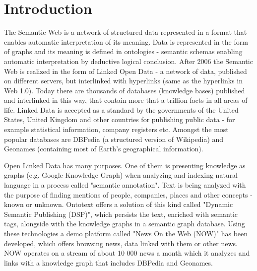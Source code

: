 \chapter{Introduction}
The Semantic Web is a network of structured data represented in a format that enables automatic interpretation of its meaning. Data is represented in the form of graphs and its meaning is defined in ontologies - semantic schemas enabling automatic interpretation by deductive logical conclusion. After 2006 the Semantic Web is realized in the form of Linked Open Data - a network of data, published on different servers, but interlinked with hyperlinks (same as the hyperlinks in Web 1.0). Today there are thousands of databases (knowledge bases) published and interlinked in this way, that contain more that a trillion facts in all areas of life. Linked Data is accepted as a standard by the governments of the United States, United Kingdom and other countries for publishing public data - for example statistical information, company registers etc. Amongst the most popular databases are DBPedia (a structured version of Wikipedia) and Geonames (containing most of Earth's geographical information).

Open Linked Data has many purposes. One of them is presenting knowledge as graphs (e.g. Google Knowledge Graph) when analyzing and indexing natural language in a process called "semantic annotation". Text is being analyzed with the purpose of finding mentions of people, companies, places and other concepts - known or unknown. Ontotext offers a solution of this kind called "Dynamic Semantic Publishing (DSP)", which persists the text, enriched with semantic tags, alongside with the knowledge graphs in a semantic graph database. Using these technologies a demo platform called "News On the Web (NOW)" has been developed, which offers browsing news, data linked with them or other news. NOW operates on a stream of about 10 000 news a month which it analyzes and links with a knowledge graph that includes DBPedia and Geonames.

